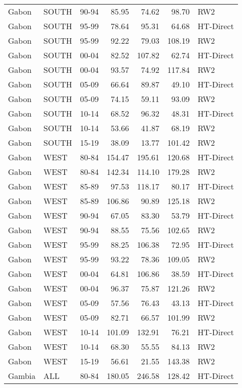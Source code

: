 \begin{longtable}{lllrrrl}
  Gabon & SOUTH & 90-94 & 85.95 & 74.62 & 98.70 & RW2 \\ 
  Gabon & SOUTH & 95-99 & 78.64 & 95.31 & 64.68 & HT-Direct \\ 
  Gabon & SOUTH & 95-99 & 92.22 & 79.03 & 108.19 & RW2 \\ 
  Gabon & SOUTH & 00-04 & 82.52 & 107.82 & 62.74 & HT-Direct \\ 
  Gabon & SOUTH & 00-04 & 93.57 & 74.92 & 117.84 & RW2 \\ 
  Gabon & SOUTH & 05-09 & 66.64 & 89.87 & 49.10 & HT-Direct \\ 
  Gabon & SOUTH & 05-09 & 74.15 & 59.11 & 93.09 & RW2 \\ 
  Gabon & SOUTH & 10-14 & 68.52 & 96.32 & 48.31 & HT-Direct \\ 
  Gabon & SOUTH & 10-14 & 53.66 & 41.87 & 68.19 & RW2 \\ 
  Gabon & SOUTH & 15-19 & 38.09 & 13.77 & 101.42 & RW2 \\ 
  Gabon & WEST & 80-84 & 154.47 & 195.61 & 120.68 & HT-Direct \\ 
  Gabon & WEST & 80-84 & 142.34 & 114.10 & 179.28 & RW2 \\ 
  Gabon & WEST & 85-89 & 97.53 & 118.17 & 80.17 & HT-Direct \\ 
  Gabon & WEST & 85-89 & 106.86 & 90.89 & 125.18 & RW2 \\ 
  Gabon & WEST & 90-94 & 67.05 & 83.30 & 53.79 & HT-Direct \\ 
  Gabon & WEST & 90-94 & 88.55 & 75.56 & 102.65 & RW2 \\ 
  Gabon & WEST & 95-99 & 88.25 & 106.38 & 72.95 & HT-Direct \\ 
  Gabon & WEST & 95-99 & 93.22 & 78.36 & 109.05 & RW2 \\ 
  Gabon & WEST & 00-04 & 64.81 & 106.86 & 38.59 & HT-Direct \\ 
  Gabon & WEST & 00-04 & 96.37 & 75.87 & 121.26 & RW2 \\ 
  Gabon & WEST & 05-09 & 57.56 & 76.43 & 43.13 & HT-Direct \\ 
  Gabon & WEST & 05-09 & 82.71 & 66.57 & 101.99 & RW2 \\ 
  Gabon & WEST & 10-14 & 101.09 & 132.91 & 76.21 & HT-Direct \\ 
  Gabon & WEST & 10-14 & 68.30 & 55.55 & 84.13 & RW2 \\ 
  Gabon & WEST & 15-19 & 56.61 & 21.55 & 143.38 & RW2 \\ 
  Gambia & ALL & 80-84 & 180.05 & 246.58 & 128.42 & HT-Direct \\ 

\end{longtable}

